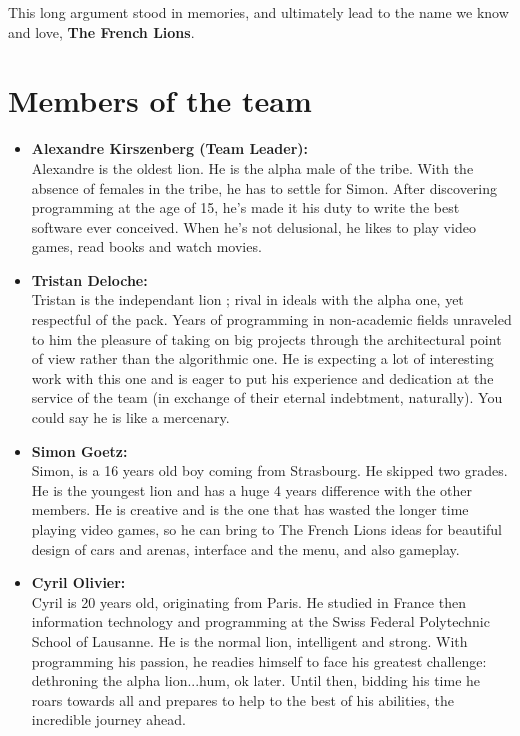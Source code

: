 This long argument stood in memories, and ultimately lead to the name we know and love, \textbf{The French Lions}.
\clearpage

\section{Members of the team}

\begin{itemize}
    \item\textbf{Alexandre Kirszenberg (Team Leader):}{\\
    Alexandre is the oldest lion. He is the alpha male of the tribe. With the absence of females in the tribe, he has to settle for Simon. After discovering programming at the age of 15, he’s made it his duty to write the best software ever conceived. When he’s not delusional, he likes to play video games, read books and watch movies.}\\

    \item\textbf{Tristan Deloche:}{\\
    Tristan is the independant lion ; rival in ideals with the alpha one, yet respectful of the pack. Years of programming in non-academic fields unraveled to him the pleasure of taking on big projects through the architectural point of view rather than the algorithmic one. He is expecting a lot of interesting work with this one and is eager to put his experience and dedication at the service of the team (in exchange of their eternal indebtment, naturally). You could say he is like a mercenary.}\\

    \item\textbf{Simon Goetz:}{\\
    Simon, is a 16 years old boy coming from Strasbourg. He skipped two grades. He is the youngest lion and has a huge 4 years difference with the other members. He is creative and is the one that has wasted the longer time playing video games, so he can bring to The French Lions ideas for beautiful design of cars and arenas, interface and the menu, and also gameplay.}\\

    \item\textbf{Cyril Olivier:}{\\
    Cyril is 20 years old, originating from Paris. He studied in France then information technology and programming at the Swiss Federal Polytechnic School of Lausanne. He is the normal lion, intelligent and strong. With programming his passion, he readies himself to face his greatest challenge: dethroning the alpha lion...hum, ok later. Until then, bidding his time he roars towards all and prepares to help to the best of his abilities, the incredible journey ahead.}\\
    
\end{itemize}

